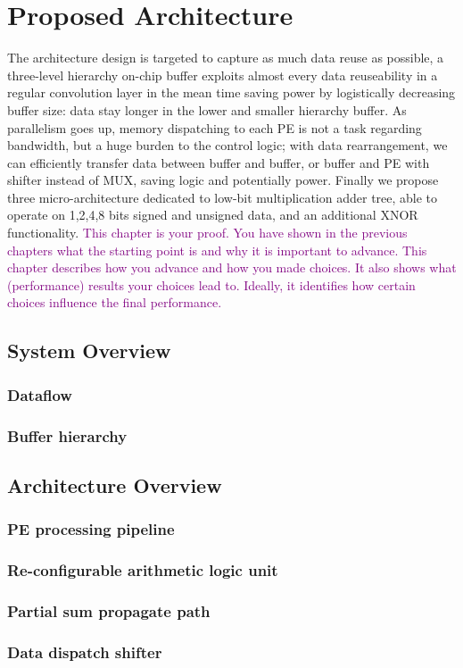 \chapter{Proposed Architecture}
The architecture design is targeted to capture as much data reuse as possible, a three-level hierarchy on-chip buffer exploits almost every data reuseability in a regular convolution layer in the mean time saving power by logistically decreasing buffer size: data stay longer in the lower and smaller hierarchy buffer. As parallelism goes up, memory dispatching to each PE is not a task regarding bandwidth, but a huge burden to the control logic; with data rearrangement, we can efficiently transfer data between buffer and buffer, or buffer and PE with shifter instead of MUX, saving logic and potentially power. Finally we propose three micro-architecture dedicated to low-bit multiplication adder tree, able to operate on 1,2,4,8 bits signed and unsigned data, and an additional XNOR functionality.
\textcolor{purple}{This chapter is your proof. You have shown in the previous chapters what the starting point is and why it is important to advance. This chapter describes how you advance and how you made choices. It also shows what (performance) results your choices lead to. Ideally, it identifies how certain choices influence the final performance.}
\section{System Overview}
\subsection{Dataflow}
\subsection{Buffer hierarchy}
\section{Architecture Overview}
\subsection{PE processing pipeline}
\subsection{Re-configurable arithmetic logic unit}
\subsection{Partial sum propagate path}
\subsection{Data dispatch shifter}
